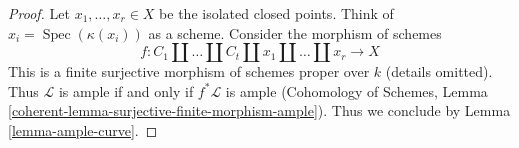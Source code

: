 \documentclass[10pt,a4paper]{amsart}
\theoremstyle{plain}
\theoremstyle{definition}
\theoremstyle{remark}
\numberwithin{equation}{subsection}
\def\Spec{\mathop{\mathrm{Spec}}}
\begin{document}
\begin{proof}
Let $x_1, \ldots, x_r \in X$ be the isolated closed points.
Think of $x_i = \Spec(\kappa(x_i))$ as a scheme.
Consider the morphism of schemes
$$
f : C_1 \amalg \ldots \amalg C_t \amalg x_1 \amalg \ldots \amalg x_r
\longrightarrow X
$$
This is a finite surjective morphism of schemes proper over $k$
(details omitted). Thus $\mathcal{L}$ is ample if and only if
$f^*\mathcal{L}$ is ample (Cohomology of Schemes, Lemma
\ref{coherent-lemma-surjective-finite-morphism-ample}).
Thus we conclude by Lemma \ref{lemma-ample-curve}.
\end{proof}
\end{document}
